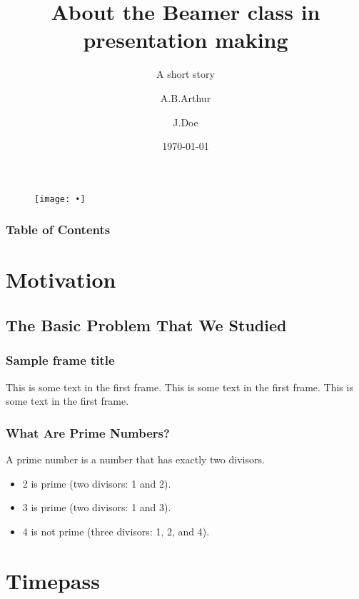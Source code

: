 \documentclass{beamer}
\title[Beamer]{About the Beamer class in presentation making}
\subtitle{A short story}
\author{A.B.Arthur \and J.Doe}
\date{\today}
\institute{UCB}
\begin{document}
\begin{frame}
\titlepage
\begin{figure}
\centering
\texttt{[image: •]}
\end{figure}
\end{frame}


\begin{frame}
\frametitle{Table of Contents}
\tableofcontents
\end{frame}

\section{Motivation}
\subsection{The Basic Problem That We Studied}
\begin{frame}
\frametitle{Sample frame title}
This is some text in the first frame. This is some text in the first frame. This is some text in the first frame.
\end{frame}



\begin{frame}
\frametitle{What Are Prime Numbers?}

\begin{definition}
A \alert{prime number} is a number that has exactly two divisors.
\end{definition}

\begin{example}
\begin{itemize}
\item 2 is prime (two divisors: 1 and 2).
\pause
\item 3 is prime (two divisors: 1 and 3).
\pause
\item 4 is not prime (\alert{three} divisors: 1, 2, and 4).
\end{itemize}
\end{example}

\end{frame}

\section{Timepass}
\end{document}
